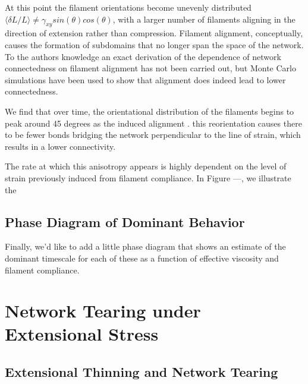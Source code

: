 \documentclass[pre,reprint]{revtex4-1}
\begin{document}
At this point the filament orientations become unevenly distributed $\langle \delta L / L \rangle \neq \gamma_{xy}sin(\theta)cos(\theta)$, with a larger number of filaments aligning in the direction of extension rather than compression.  Filament alignment, conceptually, causes the formation of subdomains that no longer span the space of the network. To the authors knowledge an exact derivation of the dependence of network connectedness on filament alignment has not been carried out, but Monte Carlo simulations have been used to show that alignment does indeed lead to lower connectedness\cite{model_percolationanisotropy}.



We find that over time, the orientational distribution of the filaments begins to peak around 45 degrees as the induced alignment .  this reorientation causes there to be fewer bonds bridging the network perpendicular to the line of strain, which results in a lower connectivity. 

The rate at which this anisotropy appears is highly dependent on the level of strain previously induced from filament compliance.  In Figure ---, we illustrate the 



\subsection{Phase Diagram of Dominant Behavior}
Finally, we'd like to add a little phase diagram that shows an estimate of the dominant timescale for each of these as a function of effective viscosity and filament compliance.


























\section{Network Tearing under Extensional Stress}


\subsection{Extensional Thinning and Network Tearing}
\end{document}
